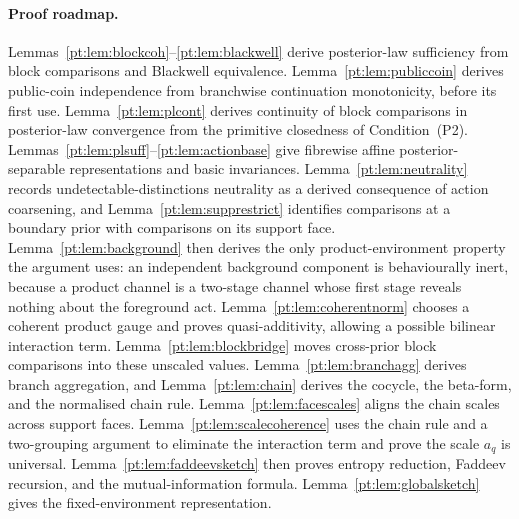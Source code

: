 \documentclass[11pt,a4paper]{article}
\theoremstyle{definition}
\newcommand{\1}{\mathbf 1}
\begin{document}
\paragraph{Proof roadmap.}
Lemmas~\ref{pt:lem:blockcoh}--\ref{pt:lem:blackwell} derive posterior-law sufficiency from block comparisons and Blackwell
equivalence.  Lemma~\ref{pt:lem:publiccoin} derives public-coin independence from branchwise continuation monotonicity,
before its first use.  Lemma~\ref{pt:lem:plcont} derives continuity of block comparisons in posterior-law convergence from the
primitive closedness of Condition~\textup{(P2)}.
Lemmas~\ref{pt:lem:plsuff}--\ref{pt:lem:actionbase} give fibrewise affine posterior-separable representations
and basic invariances.  Lemma~\ref{pt:lem:neutrality} records undetectable-distinctions neutrality as a derived consequence
of action coarsening, and Lemma~\ref{pt:lem:supprestrict} identifies comparisons at a boundary prior with comparisons on its
support face.  Lemma~\ref{pt:lem:background} then derives the only product-environment property the argument uses: an
independent background component is behaviourally inert, because a product channel is a two-stage channel whose first
stage reveals nothing about the foreground act.  Lemma~\ref{pt:lem:coherentnorm} chooses a coherent product gauge and proves
quasi-additivity, allowing a possible bilinear interaction term.  Lemma~\ref{pt:lem:blockbridge} moves cross-prior block
comparisons into these unscaled values.  Lemma~\ref{pt:lem:branchagg} derives branch aggregation, and Lemma~\ref{pt:lem:chain} derives the cocycle,
the beta-form, and the normalised chain rule.  Lemma~\ref{pt:lem:facescales} aligns the chain scales across support faces.
Lemma~\ref{pt:lem:scalecoherence} uses the chain rule and a two-grouping argument to eliminate the interaction term and prove
the scale $a_q$ is universal.
Lemma~\ref{pt:lem:faddeevsketch} then proves entropy reduction, Faddeev recursion, and the mutual-information formula.
Lemma~\ref{pt:lem:globalsketch} gives the fixed-environment representation.
\end{document}
